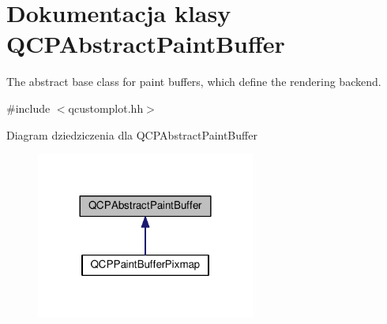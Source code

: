 \hypertarget{class_q_c_p_abstract_paint_buffer}{}\section{Dokumentacja klasy Q\+C\+P\+Abstract\+Paint\+Buffer}
\label{class_q_c_p_abstract_paint_buffer}


The abstract base class for paint buffers, which define the rendering backend.  




{\ttfamily \#include $<$qcustomplot.\+hh$>$}



Diagram dziedziczenia dla Q\+C\+P\+Abstract\+Paint\+Buffer\nopagebreak
\begin{figure}[H]
\begin{center}
\leavevmode
\includegraphics[width=204pt]{class_q_c_p_abstract_paint_buffer__inherit__graph}
\end{center}
\end{figure}
